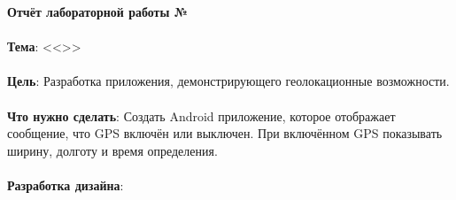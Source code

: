 \documentclass[12pt, a4paper, simple]{eskdtext}
\def \gpiDocTopic {Отчёт лабораторной работы №\gpiDocNum}
\begin{document}
    
    \thispagestyle{plain}
    \pagestyle{plain}

    \begin{center}
        \textbf{\gpiDocTopic}
    \end{center}

    \paragraph{} \textbf{Тема}: <<\gpiTopicRep>>

    \paragraph{} \textbf{Цель}: Разработка приложения, демонстрирующего геолокационные возможности.

    \paragraph{} \textbf{Что нужно сделать}:
    Создать Android приложение, которое отображает сообщение, что GPS включён или выключен.
    При включённом GPS показывать ширину, долготу и время определения.

    \paragraph{} \textbf{Разработка дизайна}:
\end{document}
